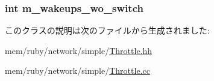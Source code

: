 \label{classThrottle_a962ed040549be2a233a2f569096ab250}
\hypertarget{classThrottle_aae3ca2ac27d25e29fa0b1856a862d658}{
\subsubsection[{m\_\-wakeups\_\-wo\_\-switch}]{\setlength{\rightskip}{0pt plus 5cm}int {\bf m\_\-wakeups\_\-wo\_\-switch}}}
\label{classThrottle_aae3ca2ac27d25e29fa0b1856a862d658}


このクラスの説明は次のファイルから生成されました:\begin{DoxyCompactItemize}
\item 
mem/ruby/network/simple/\hyperlink{Throttle_8hh}{Throttle.hh}\item 
mem/ruby/network/simple/\hyperlink{Throttle_8cc}{Throttle.cc}\end{DoxyCompactItemize}
